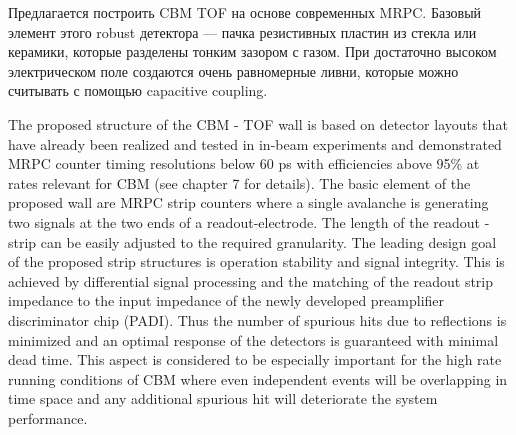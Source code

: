 Предлагается построить CBM TOF на основе современных MRPC. Базовый элемент этого robust детектора --- пачка резистивных пластин из стекла или керамики, которые разделены тонким зазором с газом. При достаточно высоком электрическом поле создаются очень равномерные ливни, которые можно считывать с помощью capacitive coupling.

The proposed structure of the CBM - TOF wall is based on detector layouts that have already been
realized and tested in in-beam experiments and demonstrated MRPC counter timing resolutions below
60 ps with efficiencies above 95\% at rates relevant for CBM (see chapter 7 for details). The basic element
of the proposed wall are MRPC strip counters where a single avalanche is generating two signals at
the two ends of a readout-electrode. The length of the readout - strip can be easily adjusted to the
required granularity. The leading design goal of the proposed strip structures is operation stability and
signal integrity. This is achieved by differential signal processing and the matching of the readout strip
impedance to the input impedance of the newly developed preamplifier discriminator chip (PADI). Thus
the number of spurious hits due to reflections is minimized and an optimal response of the detectors is
guaranteed with minimal dead time. This aspect is considered to be especially important for the high
rate running conditions of CBM where even independent events will be overlapping in time space and
any additional spurious hit will deteriorate the system performance.

